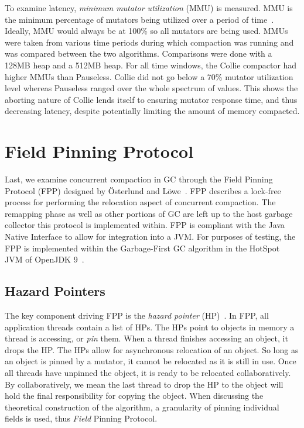 \documentclass{sig-alternate}
\begin{document}
To examine latency, \emph{minimum mutator utilization} (MMU) is measured.
MMU is the minimum percentage of mutators being utilized over a period of time~\cite{Bacon:MMU}. Ideally,
MMU would always be at 100\% so all mutators are being used. 
MMUs were taken from various time periods during which
compaction was running and was compared between the two algorithms. Comparisons were done
with a 128MB heap and a 512MB heap. For all time windows, the Collie compactor
had higher MMUs than Pauseless. Collie did not go below a 70\% mutator utilization 
level whereas Pauseless ranged over the whole spectrum of values. 
This shows the aborting nature of Collie
lends itself to ensuring mutator response time, and thus decreasing latency, 
despite potentially limiting the amount of memory compacted.


\section{Field Pinning Protocol}
\label{sec:fpp}

Last, we examine concurrent compaction in GC through the Field Pinning
Protocol (FPP) designed by \"{O}sterlund and L\"{o}we~\cite{Osterlund:FPP}.
FPP describes a lock-free process for performing the relocation aspect
of concurrent compaction. The remapping phase as well as other portions
of GC are left up to the host garbage collector this
protocol is implemented within. FPP is compliant with the Java Native Interface
to allow for integration into a JVM. For purposes of testing, the FPP 
is implemented within the Garbage-First GC algorithm in the HotSpot JVM 
of OpenJDK 9~\cite{Detlefs:G1}.


\subsection{Hazard Pointers}
\label{sec:fppHazard}

The key component driving FPP is the \emph{hazard pointer} (HP)~\cite{Osterlund:FPP}. 
In FPP, all application threads contain a list of HPs.
The HPs point to objects in memory a thread is accessing, or \emph{pin} them.
When a thread finishes accessing an object, it drops the HP.
The HPs allow for asynchronous relocation of an object. So long as an object
is pinned by a mutator, it cannot be relocated as it is still in use. Once all threads have
unpinned the object, it is ready to be relocated collaboratively.
By collaboratively, we mean the last thread to drop the HP to the object
will hold the final responsibility for copying the object.
When discussing the theoretical construction of the algorithm, a granularity of pinning 
individual fields is used, thus \emph{Field} Pinning Protocol. 
\end{document}
